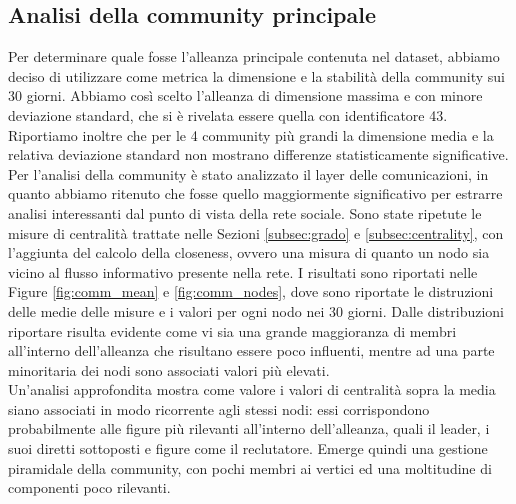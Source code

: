 \subsection{Analisi della community principale}
Per determinare quale fosse l'alleanza principale contenuta nel dataset, abbiamo deciso di utilizzare come metrica la dimensione e la stabilità della community sui 30 giorni. Abbiamo così scelto l'alleanza di dimensione massima e con minore deviazione standard, che si è rivelata essere quella con identificatore 43. Riportiamo inoltre che per le 4 community più grandi la dimensione media e la relativa deviazione standard non mostrano differenze statisticamente significative.\\
Per l'analisi della community è stato analizzato il layer delle comunicazioni, in quanto abbiamo ritenuto che fosse quello maggiormente significativo per estrarre analisi interessanti dal punto di vista della rete sociale.
Sono state ripetute le misure di centralità trattate nelle Sezioni \ref{subsec:grado} e \ref{subsec:centrality}, con l'aggiunta del calcolo della closeness, ovvero una misura di quanto un nodo sia vicino al flusso informativo presente nella rete. I risultati sono riportati nelle Figure \ref{fig:comm_mean}  e \ref{fig:comm_nodes}, dove sono riportate le distruzioni delle medie delle misure e i valori per ogni nodo nei 30 giorni. Dalle distribuzioni riportare risulta evidente come vi sia una grande maggioranza di membri all'interno dell'alleanza che risultano essere poco influenti, mentre ad una parte minoritaria dei nodi sono associati valori più elevati.\\
Un'analisi approfondita mostra come valore i valori di centralità sopra la media siano associati in modo ricorrente agli stessi nodi: essi corrispondono probabilmente alle figure più rilevanti all'interno dell'alleanza, quali il leader, i suoi diretti sottoposti e figure come il reclutatore.
Emerge quindi una gestione piramidale della community, con pochi membri ai vertici ed una moltitudine di componenti poco rilevanti.
